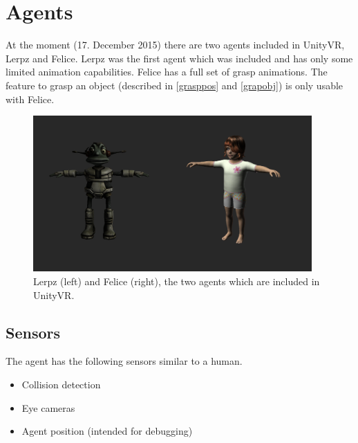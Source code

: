 \documentclass[10pt,final]{scrreprt}
\begin{document}
\newpage

\section{Agents}
At the moment (17. December 2015) there are two agents included in UnityVR, Lerpz and Felice. Lerpz was the first agent which was included and has only some limited animation capabilities. Felice has a full set of grasp animations. The feature to grasp an object (described in \ref{grasppos} and \ref{grapobj}) is only usable with Felice. 

\begin{figure}[h]
\begin{center}
\includegraphics[width=0.95\textwidth]{images/agents.png}
\end{center}
\caption{ Lerpz (left) and Felice (right), the two agents which are included in UnityVR.}
\label{imgagents}
\end{figure}
\subsection{Sensors}
The agent has the following sensors similar to a human.
\begin{itemize}
\item Collision detection
\item Eye cameras
\item Agent position (intended for debugging)
\end{itemize}
\end{document}
